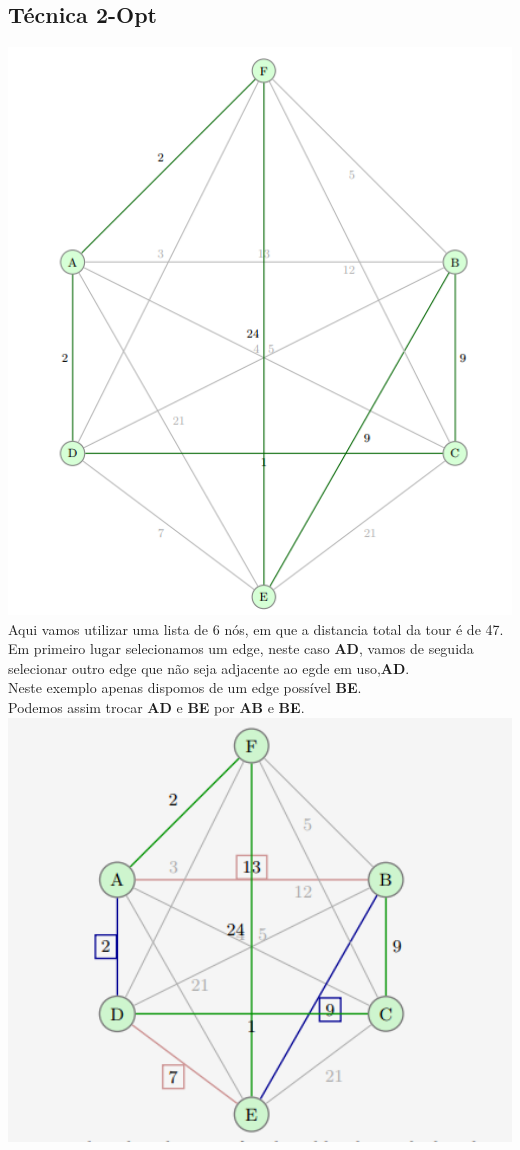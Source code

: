 \documentclass[12pt,a4paper,portrait]{article}
\begin{document}
			\subsection{Técnica 2-Opt}	
			\includegraphics[width=1.0\textwidth]{imagens/1}
			Aqui vamos utilizar uma lista de 6 nós, em que a distancia total da tour é de 47.\\
			\newpage
			Em primeiro lugar selecionamos um edge, neste caso \textbf{AD}, vamos de seguida selecionar outro edge que não seja adjacente ao egde em uso,\textbf{AD}.\\
			Neste exemplo apenas dispomos de um edge possível \textbf{BE}.\\
			Podemos assim trocar \textbf{AD} e \textbf{BE} por \textbf{AB} e \textbf{BE}.\\
			\includegraphics[width=1.0\textwidth]{imagens/2}
\end{document}
